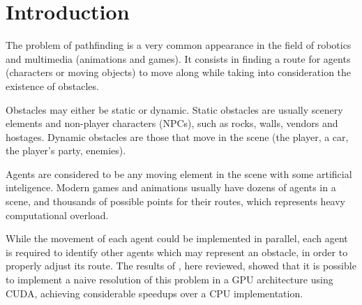 \section{Introduction}

The problem of pathfinding is a very common appearance in the field of robotics and multimedia (animations and games). It consists in finding a route for agents (characters or moving objects) to move along while taking into consideration the existence of obstacles.

Obstacles may either be static or dynamic. Static obstacles are usually scenery elements and non-player characters (NPCs), such as rocks, walls, vendors and hostages. Dynamic obstacles are those that move in the scene (the player, a car, the player's party, enemies).

Agents are considered to be any moving element in the scene with some artificial inteligence.
Modern games and animations usually have dozens of agents in a scene, and thousands of possible points for their routes, which represents heavy computational overload.

While the movement of each agent could be implemented in parallel, each agent is required to identify other agents which may represent an obstacle, in order to properly adjust its route.
The results of \cite{bleiweiss08}, here reviewed, showed that it is possible to implement a naive resolution of this problem in a GPU architecture using CUDA, achieving considerable speedups over a CPU implementation.